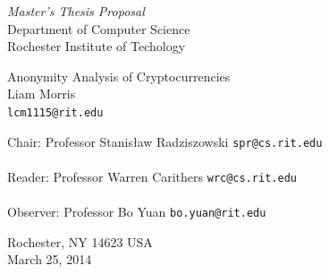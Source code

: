 \documentclass[11pt]{article}
\begin{document}
\thispagestyle{empty}
\begin{center}
\begin{Large}
\emph{Master's Thesis Proposal} \\
Department of Computer Science \\
Rochester Institute of Techology \\
\end{Large}
\vspace{4em}
{\huge Anonymity Analysis of Cryptocurrencies} \\
\vspace{3em}
{\LARGE Liam Morris} \\
{\tt lcm1115@rit.edu} \\
\vspace{3em}
\begin{adjustwidth}{.5in}{.5in}
Chair: Professor Stanis{\l}aw Radziszowski \hfill {\tt spr@cs.rit.edu} \\
\vspace{2em}
\hrulefill \\
\vspace{3em}
Reader: Professor Warren Carithers \hfill {\tt wrc@cs.rit.edu} \\
\vspace{2em}
\hrulefill \\
\vspace{3em}
Observer: Professor Bo Yuan \hfill {\tt bo.yuan@rit.edu} \\
\vspace{2em}
\hrulefill
\end{adjustwidth}
\vspace{2em}
Rochester, NY 14623 USA \\
\vspace{2em}
March 25, 2014
\end{center}
\pagebreak
\thispagestyle{empty}
\end{document}
